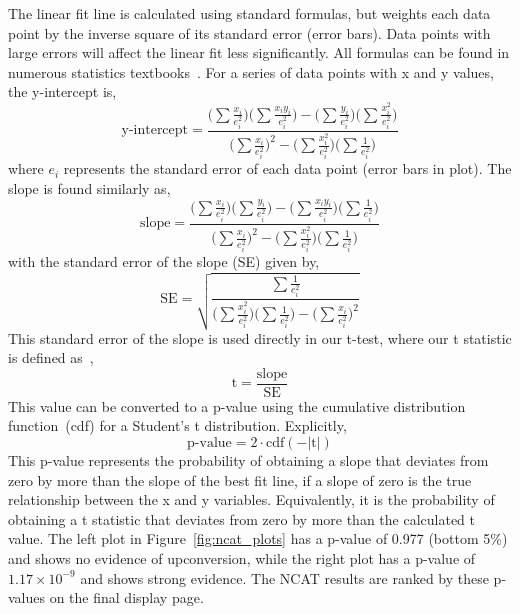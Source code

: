 The linear fit line is calculated using standard formulas, but weights each data point by the inverse square of its standard error (error bars). Data points with large errors will affect the linear fit less significantly. All formulas can be found in numerous statistics textbooks~\cite{freedman2007statistics, stats_shao}. For a series of data points with x and y values, the y-intercept is,
\begin{equation}
\label{equ:y_intercept}
    \text{y-intercept} = \frac{\big(\sum \frac{x_{i}}{e_{i}^{2}}\big) \big(\sum \frac{x_{i}y_{i}}{e_{i}^{2}}\big)-\big(\sum \frac{y_{i}}{e_{i}^{2}}\big) \big(\sum \frac{x_{i}^{2}}{e_{i}^{2}}\big)}{\big(\sum \frac{x_{i}}{e_{i}^{2}}\big)^{2} - \big(\sum \frac{x_{i}^{2}}{e_{i}^{2}}\big) \big(\sum \frac{1}{e_{i}^{2}}\big)}
\end{equation}
where $e_{i}$ represents the standard error  of each data point (error bars in plot). The slope is found similarly as,
\begin{equation}
\label{equ:slope}
    \text{slope} = \frac{\big(\sum \frac{x_{i}}{e_{i}^{2}}\big) \big(\sum \frac{y_{i}}{e_{i}^{2}}\big)-\big(\sum \frac{x_{i}y_{i}}{e_{i}^{2}}\big) \big(\sum \frac{1}{e_{i}^{2}}\big)}{\big(\sum \frac{x_{i}}{e_{i}^{2}}\big)^{2} - \big(\sum \frac{x_{i}^{2}}{e_{i}^{2}}\big) \big(\sum \frac{1}{e_{i}^{2}}\big)}
\end{equation}
with the standard error of the slope (SE) given by,
\begin{equation}
\label{equ:slope_error}
    \text{SE} = \sqrt{\frac{\sum \frac{1}{e_{i}^{2}}}{\big(\sum \frac{x_{i}^{2}}{e_{i}^{2}}\big) \big(\sum \frac{1}{e_{i}^{2}}\big)-\big(\sum \frac{x_{i}}{e_{i}^{2}}\big)^{2}}}
\end{equation}
This standard error of the slope is used directly in our t-test, where our t statistic is defined as~\cite{freedman2007statistics},
\begin{equation}
\label{equ:t_test}
    \text{t} = \frac{\text{slope}}{\text{SE}}
\end{equation}
This value can be converted to a p-value using the cumulative distribution function~(cdf) for a Student's t distribution. Explicitly,
\begin{equation}
\label{equ:p_value}
    \text{p-value} = 2\cdot\text{cdf}(-|\text{t}|)
\end{equation}
This p-value represents the probability of obtaining a slope that deviates from zero by more than the slope of the best fit line, if a slope of zero is the true relationship between the x and y variables. Equivalently, it is the probability of obtaining a t statistic that deviates from zero by more than the calculated t value. The left plot in Figure~\ref{fig:ncat_plots} has a p-value of 0.977 (bottom 5\%) and shows no evidence of upconversion, while the right plot has a p-value of $1.17\times10^{-9}$ and shows strong evidence. The NCAT results are ranked by these p-values on the final display page.

